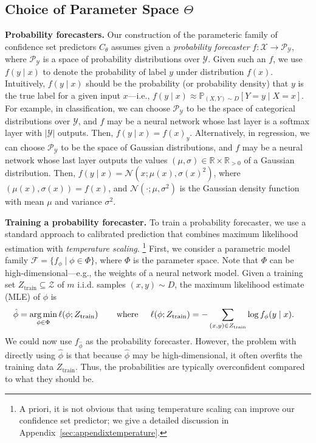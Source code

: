 \documentclass{article} \usepackage{iclr2020_conference,times}
\renewcommand{\(}						{\left(}
\renewcommand{\)}						{\right)}
\renewcommand{\[}						{\left[}
\renewcommand{\]}						{\right]}
\newcommand{\<}						{\left<}
\renewcommand{\>}						{\right>}
\begin{document}
\subsection{Choice of Parameter Space $\Theta$}

\textbf{Probability forecasters.}
Our construction of the parameteric family of confidence set predictors $C_{\theta}$ assumes given a \emph{probability forecaster} $f:\mathcal{X}\to\mathcal{P}_{\mathcal{Y}}$, where $\mathcal{P}_{\mathcal{Y}}$ is a space of probability distributions over $\mathcal{Y}$. Given such an $f$, we use $f(y\mid x)$ to denote the probability of label $y$ under distribution $f(x)$. Intuitively, $f(y\mid x)$ should be the probability (or probability density) that $y$ is the true label for a given input $x$---i.e.,
$f(y\mid x)\approx\mathbb{P}_{(X,Y)\sim D}[Y=y\mid X=x]$.
For example, in classification, we can choose $\mathcal{P}_{\mathcal{Y}}$ to be the space of categorical distributions over $\mathcal{Y}$, and $f$ may be a neural network whose last layer is a softmax layer with $|\mathcal{Y}|$ outputs. Then, $f(y\mid x)=f(x)_y$. Alternatively, in regression, we can choose $\mathcal{P}_{\mathcal{Y}}$ to be the space of Gaussian distributions, and $f$ may be a neural network whose last layer outputs the values $(\mu,\sigma)\in\mathbb{R}\times\mathbb{R}_{>0}$ of a Gaussian distribution. Then, $f(y\mid x)=\mathcal{N}(x;\mu(x),\sigma(x)^2)$, where $(\mu(x),\sigma(x))=f(x)$, and $\mathcal{N}(\cdot;\mu,\sigma^2)$ is the Gaussian density function with mean $\mu$ and variance $\sigma^2$.

\textbf{Training a probability forecaster.}
To train a probability forecaster, we use a standard approach to calibrated prediction that combines maximum likelihood estimation with \emph{temperature scaling}.
\footnote{A priori, it is not obvious that using temperature scaling can improve our confidence set predictor; we give a detailed discussion in Appendix~\ref{sec:appendixtemperature}.}
First, we consider a parametric model family $\mathcal{F}=\{f_{\phi}\mid\phi\in\Phi\}$, where $\Phi$ is the parameter space. Note that $\Phi$ can be high-dimensional---e.g., the weights of a neural network model. Given a training set $Z_{\text{train}}\subseteq\mathcal{Z}$ of $m$ i.i.d. samples $(x,y)\sim D$, the maximum likelihood estimate (MLE) of $\phi$ is
\begin{align}
\label{eqn:mle1}
\hat{\phi}&=\operatorname*{\arg\min}_{\phi\in\Phi}\ell(\phi;Z_{\text{train}})
\hspace{0.3in}\text{where}\hspace{0.2in}
\ell(\phi;Z_{\text{train}})=-\sum_{(x,y)\in Z_{\text{train}}}\log f_{\phi}(y\mid x).
\end{align}
We could now use $f_{\hat{\phi}}$ as the probability forecaster. However, the problem with directly using $\hat{\phi}$ is that because $\hat{\phi}$ may be high-dimensional, it often overfits the training data $Z_{\text{train}}$. Thus, the probabilities are typically overconfident compared to what they should be.
\end{document}
